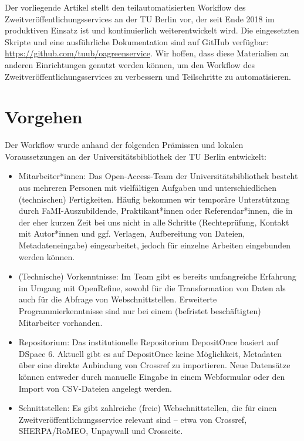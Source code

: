 \documentclass[a4paper,
fontsize=11pt,
oneside,
numbers=noperiodatend,
parskip=half-,
bibliography=totoc,
final
]{scrartcl}
\begin{document}
Der vorliegende Artikel stellt den teilautomatisierten Workflow des
Zweitveröffentlichungsservices an der TU Berlin vor, der seit Ende 2018
im produktiven Einsatz ist und kontinuierlich weiterentwickelt wird. Die
eingesetzten Skripte und eine ausführliche Dokumentation sind auf GitHub
verfügbar: \url{https://github.com/tuub/oagreenservice}. Wir hoffen,
dass diese Materialien an anderen Einrichtungen genutzt werden können,
um den Workflow des Zweitveröffentlichungsservices zu verbessern und
Teilschritte zu automatisieren.

\hypertarget{vorgehen}{%
\section*{Vorgehen}\label{vorgehen}}

Der Workflow wurde anhand der folgenden Prämissen und lokalen
Voraussetzungen an der Universitätsbibliothek der TU Berlin entwickelt:

\begin{itemize}
\item
  Mitarbeiter*innen: Das Open-Access-Team der Universitätsbibliothek
  besteht aus mehreren Personen mit vielfältigen Aufgaben und
  unterschiedlichen (technischen) Fertigkeiten. Häufig bekommen wir
  temporäre Unterstützung durch FaMI-Auszubildende, Praktikant*innen
  oder Referendar*innen, die in der eher kurzen Zeit bei uns nicht in
  alle Schritte (Rechteprüfung, Kontakt mit Autor*innen und ggf.
  Verlagen, Aufbereitung von Dateien, Metadateneingabe) eingearbeitet,
  jedoch für einzelne Arbeiten eingebunden werden können.
\item
  (Technische) Vorkenntnisse: Im Team gibt es bereits umfangreiche
  Erfahrung im Umgang mit OpenRefine, sowohl für die Transformation von
  Daten als auch für die Abfrage von Webschnittstellen. Erweiterte
  Programmierkenntnisse sind nur bei einem (befristet beschäftigten)
  Mitarbeiter vorhanden.
\item
  Repositorium: Das institutionelle Repositorium DepositOnce basiert auf
  DSpace 6. Aktuell gibt es auf DepositOnce keine Möglichkeit, Metadaten
  über eine direkte Anbindung von Crossref zu importieren. Neue
  Datensätze können entweder durch manuelle Eingabe in einem Webformular
  oder den Import von CSV-Dateien angelegt werden.
\item
  Schnittstellen: Es gibt zahlreiche (freie) Webschnittstellen, die für
  einen Zweitveröffentlichungsservice relevant sind -- etwa von
  Crossref, SHERPA/RoMEO, Unpaywall und Crosscite.
\end{itemize}
\end{document}

